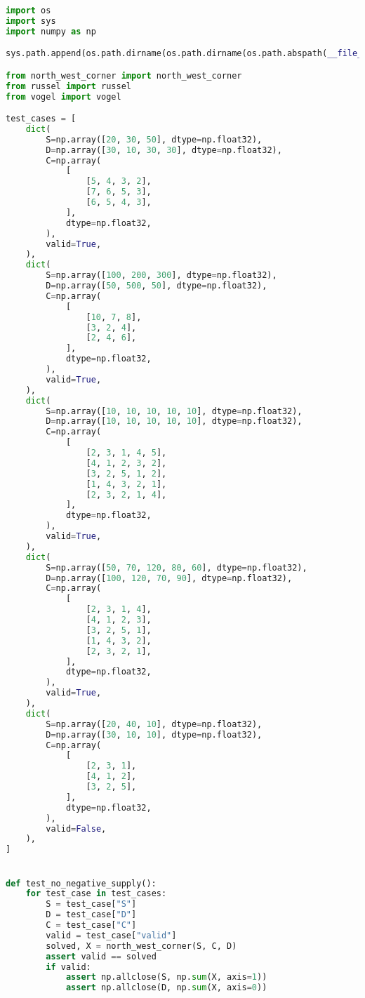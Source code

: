 \documentclass{article}
\begin{document}
\begin{lstlisting}[language=Python]
import os
import sys
import numpy as np

sys.path.append(os.path.dirname(os.path.dirname(os.path.abspath(__file__))))

from north_west_corner import north_west_corner
from russel import russel
from vogel import vogel

test_cases = [
    dict(
        S=np.array([20, 30, 50], dtype=np.float32),
        D=np.array([30, 10, 30, 30], dtype=np.float32),
        C=np.array(
            [
                [5, 4, 3, 2],
                [7, 6, 5, 3],
                [6, 5, 4, 3],
            ],
            dtype=np.float32,
        ),
        valid=True,
    ),
    dict(
        S=np.array([100, 200, 300], dtype=np.float32),
        D=np.array([50, 500, 50], dtype=np.float32),
        C=np.array(
            [
                [10, 7, 8],
                [3, 2, 4],
                [2, 4, 6],
            ],
            dtype=np.float32,
        ),
        valid=True,
    ),
    dict(
        S=np.array([10, 10, 10, 10, 10], dtype=np.float32),
        D=np.array([10, 10, 10, 10, 10], dtype=np.float32),
        C=np.array(
            [
                [2, 3, 1, 4, 5],
                [4, 1, 2, 3, 2],
                [3, 2, 5, 1, 2],
                [1, 4, 3, 2, 1],
                [2, 3, 2, 1, 4],
            ],
            dtype=np.float32,
        ),
        valid=True,
    ),
    dict(
        S=np.array([50, 70, 120, 80, 60], dtype=np.float32),
        D=np.array([100, 120, 70, 90], dtype=np.float32),
        C=np.array(
            [
                [2, 3, 1, 4],
                [4, 1, 2, 3],
                [3, 2, 5, 1],
                [1, 4, 3, 2],
                [2, 3, 2, 1],
            ],
            dtype=np.float32,
        ),
        valid=True,
    ),
    dict(
        S=np.array([20, 40, 10], dtype=np.float32),
        D=np.array([30, 10, 10], dtype=np.float32),
        C=np.array(
            [
                [2, 3, 1],
                [4, 1, 2],
                [3, 2, 5],
            ],
            dtype=np.float32,
        ),
        valid=False,
    ),
]


def test_no_negative_supply():
    for test_case in test_cases:
        S = test_case["S"]
        D = test_case["D"]
        C = test_case["C"]
        valid = test_case["valid"]
        solved, X = north_west_corner(S, C, D)
        assert valid == solved
        if valid:
            assert np.allclose(S, np.sum(X, axis=1))
            assert np.allclose(D, np.sum(X, axis=0))



\end{lstlisting}
\end{document}

